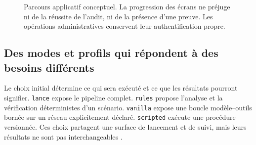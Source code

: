 \documentclass[11pt,a4paper]{article}
\begin{document}
\begin{figure}[H]
\centering
{}
\caption{Parcours applicatif conceptuel. La progression des écrans ne préjuge
ni de la réussite de l'audit, ni de la présence d'une preuve. Les opérations
administratives conservent leur authentification propre.}
\label{fig:application-parcours}
\end{figure}

\subsection{Des modes et profils qui répondent à des besoins différents}
Le choix initial détermine ce qui sera exécuté et ce que les résultats pourront
signifier. \texttt{lance} expose le pipeline complet. \texttt{rules} propose
l'analyse et la vérification déterministes d'un scénario. \texttt{vanilla}
expose une boucle modèle--outils bornée sur un réseau explicitement déclaré.
\texttt{scripted} exécute une procédure versionnée. Ces choix partagent une
surface de lancement et de suivi, mais leurs résultats ne sont pas
interchangeables \cite{app-modes,app-start}.
\end{document}
